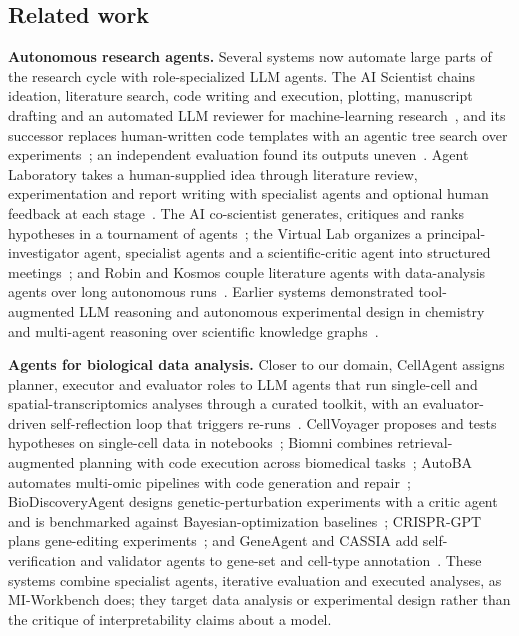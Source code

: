 \documentclass[10pt,letterpaper]{article}
\begin{document}
\subsection*{Related work}

\noindent\textbf{Autonomous research agents.} Several systems now automate large parts of the research cycle with role-specialized LLM agents. The AI Scientist chains ideation, literature search, code writing and execution, plotting, manuscript drafting and an automated LLM reviewer for machine-learning research~\cite{lu2024aiscientist,lu2026aiscientist}, and its successor replaces human-written code templates with an agentic tree search over experiments~\cite{yamada2025aiscientistv2}; an independent evaluation found its outputs uneven~\cite{beel2025evaluating}. Agent Laboratory takes a human-supplied idea through literature review, experimentation and report writing with specialist agents and optional human feedback at each stage~\cite{schmidgall2025agentlab}. The AI co-scientist generates, critiques and ranks hypotheses in a tournament of agents~\cite{gottweis2025coscientist,gottweis2026coscientist}; the Virtual Lab organizes a principal-investigator agent, specialist agents and a scientific-critic agent into structured meetings~\cite{swanson2025virtuallab}; and Robin and Kosmos couple literature agents with data-analysis agents over long autonomous runs~\cite{ghareeb2026robin,mitchener2025kosmos}. Earlier systems demonstrated tool-augmented LLM reasoning and autonomous experimental design in chemistry~\cite{bran2024chemcrow,boiko2023autonomous} and multi-agent reasoning over scientific knowledge graphs~\cite{ghafarollahi2024sciagents}.

\noindent\textbf{Agents for biological data analysis.} Closer to our domain, CellAgent assigns planner, executor and evaluator roles to LLM agents that run single-cell and spatial-transcriptomics analyses through a curated toolkit, with an evaluator-driven self-reflection loop that triggers re-runs~\cite{xiao2024cellagent,xiao2026cellagent}. CellVoyager proposes and tests hypotheses on single-cell data in notebooks~\cite{alber2026cellvoyager}; Biomni combines retrieval-augmented planning with code execution across biomedical tasks~\cite{huang2026biomni}; AutoBA automates multi-omic pipelines with code generation and repair~\cite{zhou2024autoba}; BioDiscoveryAgent designs genetic-perturbation experiments with a critic agent and is benchmarked against Bayesian-optimization baselines~\cite{roohani2025biodiscoveryagent}; CRISPR-GPT plans gene-editing experiments~\cite{qu2025crisprgpt}; and GeneAgent and CASSIA add self-verification and validator agents to gene-set and cell-type annotation~\cite{wang2025geneagent,xie2026cassia}. These systems combine specialist agents, iterative evaluation and executed analyses, as MI-Workbench does; they target data analysis or experimental design rather than the critique of interpretability claims about a model.
\end{document}
